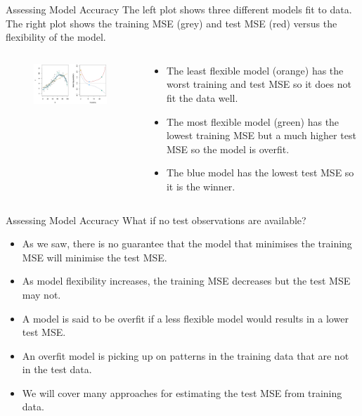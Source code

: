 \documentclass[
  ignorenonframetext,
  aspectratio=169,
]{beamer}
\providecommand{\tightlist}{%
  \setlength{\itemsep}{0pt}\setlength{\parskip}{0pt}}\usepackage{longtable,booktabs,array}
\begin{document}
\begin{frame}{Assessing Model Accuracy}
\protect\hypertarget{assessing-model-accuracy-1}{}
The left plot shows three different models fit to data. The right plot
shows the training MSE (grey) and test MSE (red) versus the flexibility
of the model.

\begin{columns}[T]
\begin{column}{0.67\textwidth}
\begin{figure}

\includegraphics[width=3.80208in,height=\textheight]{images/test_training_mse.png} \hfill{}

\end{figure}
\end{column}

\begin{column}{0.33\textwidth}
\begin{itemize}
\tightlist
\item
  The least flexible model (orange) has the worst training and test MSE
  so it does not fit the data well.
\item
  The most flexible model (green) has the lowest training MSE but a much
  higher test MSE so the model is overfit.
\item
  The blue model has the lowest test MSE so it is the winner.
\end{itemize}
\end{column}
\end{columns}
\end{frame}

\begin{frame}{Assessing Model Accuracy}
\protect\hypertarget{assessing-model-accuracy-2}{}
What if no test observations are available?

\begin{itemize}
\tightlist
\item
  As we saw, there is no guarantee that the model that minimises the
  training MSE will minimise the test MSE.
\item
  As model flexibility increases, the training MSE decreases but the
  test MSE may not.
\item
  A model is said to be overfit if a less flexible model would results
  in a lower test MSE.
\item
  An overfit model is picking up on patterns in the training data that
  are not in the test data.
\item
  We will cover many approaches for estimating the test MSE from
  training data.
\end{itemize}
\end{frame}
\end{document}
